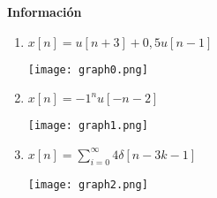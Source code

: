 \documentclass[11pt]{article}
\begin{document}

\maketitle %

\thispagestyle{empty} %

\newpage


\begin{question}


  \textbf{Información}
  
\begin{enumerate}
\item{$x[n] = u[n+3] + 0,5u[n-1]$}
  \begin{center}
    \texttt{[image: graph0.png]} %
  \end{center}
\item{$x[n] = -1^{n} u[-n-2]$}
  \begin{center}
    \texttt{[image: graph1.png]} %
  \end{center}
\item{$x[n] = \sum_{i=0}^{\infty} 4\delta[n-3k-1] $}
  \begin{center}
    \texttt{[image: graph2.png]} %
  \end{center}
\end{enumerate}

\end{question}

\end{document}
